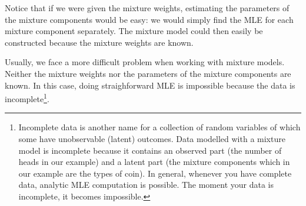 Notice that if we were given the mixture weights, estimating
the parameters of the mixture components would be easy: we would simply find the MLE for each mixture component separately. The mixture
model could then easily be constructed because the mixture weights are known. 

Usually, we face a more difficult problem when working with mixture models. Neither the mixture
weights nor the parameters of the mixture components are known. In this case, doing straighforward MLE is impossible because the data is
incomplete\footnote{Incomplete data is 
  another name for a collection of random variables of which some have unobservable (latent) outcomes. Data modelled with a mixture model is incomplete because it contains
  an observed part (the number of heads in our example) and a latent
  part (the mixture components which in our example are the types of coin). In general, whenever you have complete data, analytic MLE computation is possible. The moment your data is incomplete, it becomes impossible.}. 

